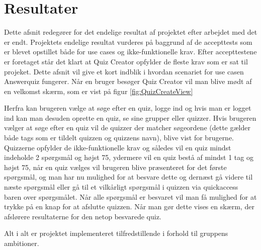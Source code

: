 \section{Resultater}
Dette afsnit redegører for det endelige resultat af projektet efter arbejdet med det er endt. Projektets endelige resultat vurderes på baggrund af de accepttests som er blevet opstillet både for use cases og ikke-funktionelle krav. Efter accepttestene er foretaget står det klart at Quiz Creator opfylder de fleste krav som er sat til projeket. Dette afsnit vil give et kort indblik i hvordan scenariet for use casen Answerquiz fungerer. Når en bruger besøger Quiz Creator vil man blive mødt af en velkomst skærm, som er vist på figur \ref{fig:QuizCreateView}


Herfra kan brugeren vælge at søge efter en quiz, logge ind og hvis man er logget ind kan man desuden oprette en quiz, se sine grupper eller quizzer. Hvis brugeren vælger at søge efter en quiz vil de quizzer der matcher søgeordene (dette gælder både tags som er tildelt quizzen og quizzens navn), blive vist for brugerne. Quizzerne opfylder de ikke-funktionelle krav og således vil en quiz mindst indeholde 2 spørgsmål og højst 75, ydermere vil en quiz bestå af mindst 1 tag og højst 75, når en quiz vælges vil brugeren blive præsenteret for det første spørgsmål, og man har nu mulighed for at besvare dette og dernæst gå videre til næste spørgsmål eller gå til et vilkårligt spørgsmål i quizzen via quickaccess baren over spørgsmålet. Når alle spørgsmål er besvaret vil man få mulighed for at trykke på en knap for at afslutte quizzen. Når man gør dette vises en skærm, der afslørere resultaterne for den netop besvarede quiz.

Alt i alt er projektet implementeret tilfredstillende i forhold til gruppens ambitioner. 

